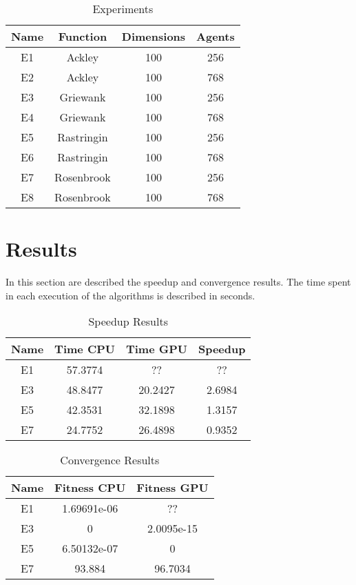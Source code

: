 \documentclass[conference]{IEEEtran}
\begin{document}
\begin{table}[!htbp]
    \renewcommand{\arraystretch}{1.3}
    \caption{Experiments}
    \label{experiments}
    \centering
    \begin{tabular}{c|c|c|c}
    \hline
        \bf Name & Function &  Dimensions & Agents\\
    \hline
        E1 & Ackley & 100 & 256\\
        E2 & Ackley & 100 & 768\\
        E3 & Griewank & 100 & 256\\
        E4 & Griewank & 100 & 768\\
        E5 & Rastringin & 100 & 256\\
        E6 & Rastringin & 100 & 768\\
        E7 & Rosenbrook & 100 & 256\\
        E8 & Rosenbrook & 100 & 768\\
    \end{tabular}
\end{table}

\section{Results}

In this section are described the speedup and convergence results. The
time spent in each execution of the algorithms is described in seconds.

\begin{table}[!t]
    \renewcommand{\arraystretch}{1.3}
    \caption{Speedup Results}
    \label{results}
    \centering
    \begin{tabular}{c|c|c|c}
    \hline
        \bf Name & Time CPU & Time GPU & Speedup\\
    \hline
        E1 & 57.3774 & ?? & ?? \\
        E3 & 48.8477 & 20.2427 & 2.6984 \\
        E5 & 42.3531 & 32.1898 & 1.3157 \\
        E7 & 24.7752 & 26.4898 & 0.9352 \\
    \end{tabular}
\end{table}

\begin{table}[!t]
    \renewcommand{\arraystretch}{1.3}
    \caption{Convergence Results}
    \label{results}
    \centering
    \begin{tabular}{c|c|c}
    \hline
        \bf Name & Fitness CPU & Fitness GPU \\
    \hline
        E1 & 1.69691e-06 & ?? \\
        E3 & 0 &  2.0095e-15  \\
        E5 & 6.50132e-07 & 0 \\
        E7 & 93.884 & 96.7034 & \\
    \end{tabular}
\end{table}
\end{document}
